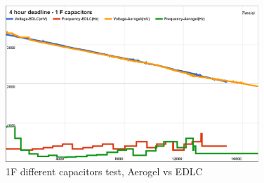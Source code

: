 \begin{figure}[ht] \centering
\includegraphics[width=0.85\textwidth]{img/captest1.png}
\caption{1F different capacitors test, Aerogel vs EDLC}
\label{fig:captest}
\end{figure}


